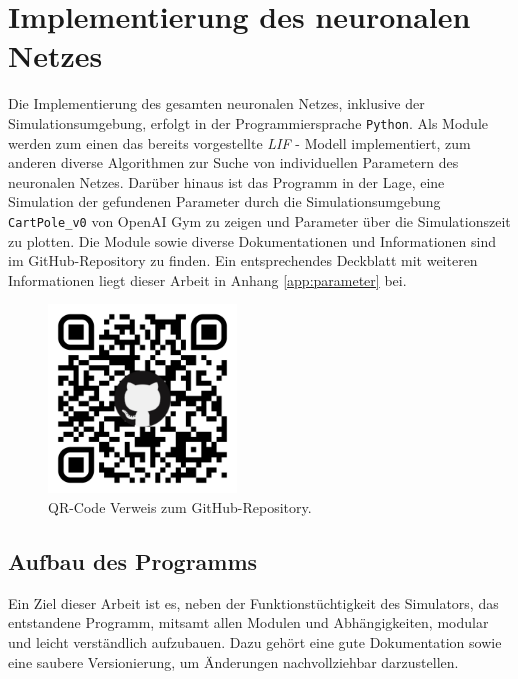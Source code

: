 %
\chapter{Implementierung des neuronalen Netzes}
\label{chap:imp}
%

	\begin{minipage}[b]{0.65\textwidth}
		Die Implementierung des gesamten neuronalen Netzes, inklusive der Simulationsumgebung, erfolgt in der Programmiersprache \texttt{Python}. Als Module werden zum einen das bereits vorgestellte \textit{LIF} - Modell implementiert, zum anderen diverse Algorithmen zur Suche von individuellen Parametern des neuronalen Netzes. Darüber hinaus ist das Programm in der Lage, eine Simulation der gefundenen Parameter durch die Simulationsumgebung \texttt{CartPole\_v0} von OpenAI Gym \cite{Brockman2016} zu zeigen und Parameter über die Simulationszeit zu plotten. Die Module sowie diverse Dokumentationen und Informationen sind im GitHub-Repository\footnotemark{} zu finden. Ein entsprechendes Deckblatt mit weiteren Informationen liegt dieser Arbeit in Anhang \ref{app:parameter} bei.
	\end{minipage}
	\begin{minipage}[b]{0.35\textwidth}
		\begin{figure}[H] %
			\centering
			\includegraphics[width=5cm]{figures/appendix/qr-code.pdf}
			\caption{QR-Code Verweis zum GitHub-Repository.}
			\label{fig:qr}
		\end{figure}
	\end{minipage}
		

\section{Aufbau des Programms}
\label{sec:imp_module}
	Ein Ziel dieser Arbeit ist es, neben der Funktionstüchtigkeit des Simulators, das entstandene Programm, mitsamt allen Modulen und Abhängigkeiten, modular und leicht verständlich aufzubauen. Dazu gehört eine gute Dokumentation sowie eine saubere Versionierung, um Änderungen nachvollziehbar darzustellen.
	
